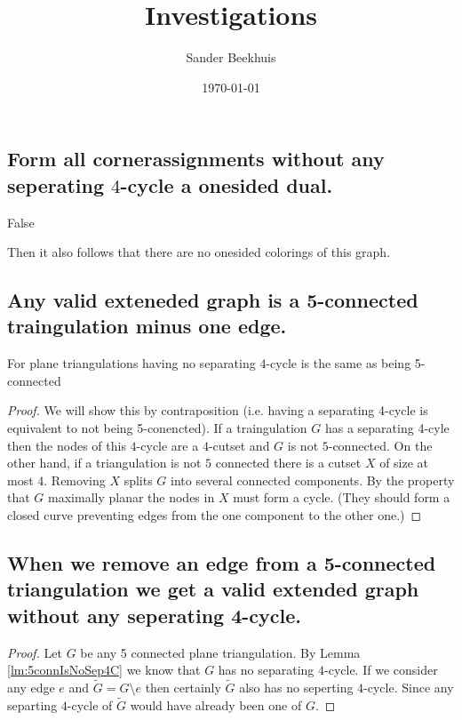 




\title{Investigations}
\author{Sander Beekhuis}
\date{\today} %



\maketitle

\subsection*{Form all cornerassignments without any seperating $4$-cycle a onesided dual. }
False

Then it also follows that there are no onesided colorings of this graph.



\subsection*{Any valid exteneded graph is a 5-connected traingulation minus one edge.}


\begin{lemma}
  \label{lm:5connIsNoSep4C}
  For plane triangulations having no separating 4-cycle is the same as being 5-connected
\end{lemma}

\begin{proof}
We will show this by contraposition (i.e. having a separating 4-cycle is equivalent to not being 5-conencted).
If a traingulation $G$ has a separating 4-cyle then the nodes of this $4$-cycle are a $4$-cutset and $G$ is not $5$-connected.
On the other hand, if a triangulation is not $5$ connected there is a cutset $X$ of size at most $4$. Removing $X$ splits $G$ into several connected components. By the property that $G$ maximally planar the nodes in $X$ must form a cycle. (They should form a closed curve preventing edges from the one component to the other one.)
\end{proof}

\subsection*{When we remove an edge from a 5-connected triangulation we get a valid extended graph without any seperating 4-cycle.}

\begin{proof}
  Let $G$ be any 5 connected plane triangulation. By Lemma \ref{lm:5connIsNoSep4C} we know that $G$ has no separating $4$-cycle. If we consider any edge $e$ and $\tilde{G} = G \setminus{e}$ then certainly $\tilde{G}$ also has no seperting $4$-cycle. Since any separting $4$-cycle of $\tilde{G}$ would have already been one of $G$.
\end{proof}

